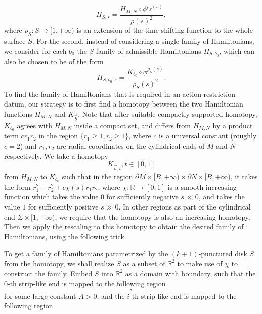 \documentclass{amsart}
\numberwithin{equation}{section}
\numberwithin{figure}{section}
\begin{document}
\begin{equation}
H_{S, s} = \frac{H_{M, N} \circ \phi^{\rho_{S}(s)}}{\rho(s)^{2}},
\end{equation}
where $\rho_{S}: S \to [1, +\infty)$ is an extension of the time-shifting function to the whole surface $S$. For the second, instead of considering a single family of Hamiltonians, we consider for each $b_{0}$ the $S$-family of admissible Hamiltonians $H_{S, b_{0}}$, which can also be chosen to be of the form
\begin{equation}
H_{S, b_{0}, s} = \frac{K_{b_{0}} \circ \phi^{\rho_{S}(s)}}{\rho_{S}(s)^{2}}.
\end{equation}
To find the family of Hamiltonians that is required in an action-restriction datum, our strategy is to first find a homotopy between the two Hamiltonian functions $H_{M, N}$ and $K_{\vec{b}}$. Note that after suitable compactly-supported homotopy, $K_{b_{0}}$ agrees with $H_{M, N}$ inside a compact set, and differs from $H_{M, N}$ by a product term $c r_{1} r_{2}$ in the region $\{ r_{1} \ge 1, r_{2} \ge 1 \}$, where $c$ is a universal constant (roughly $c = 2$) and $r_{1}, r_{2}$ are radial coordinates on the cylindrical ends of $M$ and $N$ respectively. We take a homotopy 
\begin{equation*}
K_{\vec{b}, t}, t \in [0, 1]
\end{equation*}
from $H_{M, N}$ to $K_{b_{0}}$ such that in the region $\partial M \times [B, +\infty) \times \partial N \times [B, +\infty)$, it takes the form $r_{1}^{2} + r_{2}^{2} + c \chi(s) r_{1}r_{2}$, where $\chi: \mathbb{R} \to [0, 1]$ is a smooth increasing function which takes the value $0$ for sufficiently negative $s \ll 0$, and takes the value $1$ for sufficiently positive $s \gg 0$. In other regions as part of the cylindrical end $\Sigma \times [1, +\infty)$, we require that the homotopy is also an increasing homotopy. Then we apply the rescaling to this homotopy to obtain the desired family of Hamiltonians, using the following trick. \par
	To get a family of Hamiltonians parametrized by the $(k+1)$-punctured disk $S$ from the homotopy, we shall realize $S$ as a subset of $\mathbb{R}^{2}$ to make use of $\chi$ to construct the family. Embed $S$ into $\mathbb{R}^{2}$ as a domain with boundary, such that the $0$-th strip-like end is mapped to the following region
\begin{equation*}
[A, +\infty) \times [-\frac{1}{2}, \frac{1}{2}],
\end{equation*}
for some large constant $A > 0$, and the $i$-th strip-like end is mapped to the following region
\end{document}
